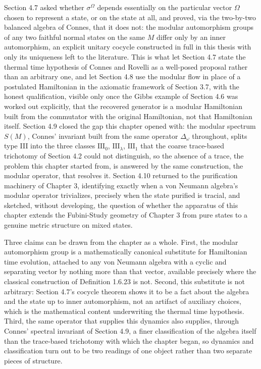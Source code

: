 Section 4.7 asked whether $\sigma^\Omega$ depends essentially on the particular vector $\Omega$ chosen to represent a state, or on the state at all, and proved, via the two-by-two balanced algebra of Connes, that it does not: the modular automorphism groups of any two faithful normal states on the same $M$ differ only by an inner automorphism, an explicit unitary cocycle constructed in full in this thesis with only its uniqueness left to the literature. This is what let Section 4.7 state the thermal time hypothesis of Connes and Rovelli as a well-posed proposal rather than an arbitrary one, and let Section 4.8 use the modular flow in place of a postulated Hamiltonian in the axiomatic framework of Section 3.7, with the honest qualification, visible only once the Gibbs example of Section 4.6 was worked out explicitly, that the recovered generator is a modular Hamiltonian built from the commutator with the original Hamiltonian, not that Hamiltonian itself. Section 4.9 closed the gap this chapter opened with: the modular spectrum $S(M)$, Connes' invariant built from the same operator $\Delta_\omega$ throughout, splits type III into the three classes $\mathrm{III}_0$, $\mathrm{III}_\lambda$, $\mathrm{III}_1$ that the coarse trace-based trichotomy of Section 4.2 could not distinguish, so the absence of a trace, the problem this chapter started from, is answered by the same construction, the modular operator, that resolves it. Section 4.10 returned to the purification machinery of Chapter 3, identifying exactly when a von Neumann algebra's modular operator trivializes, precisely when the state purified is tracial, and sketched, without developing, the question of whether the apparatus of this chapter extends the Fubini-Study geometry of Chapter 3 from pure states to a genuine metric structure on mixed states.

Three claims can be drawn from the chapter as a whole. First, the modular automorphism group is a mathematically canonical substitute for Hamiltonian time evolution, attached to any von Neumann algebra with a cyclic and separating vector by nothing more than that vector, available precisely where the classical construction of Definition 1.6.23 is not. Second, this substitute is not arbitrary: Section 4.7's cocycle theorem shows it to be a fact about the algebra and the state up to inner automorphism, not an artifact of auxiliary choices, which is the mathematical content underwriting the thermal time hypothesis. Third, the same operator that supplies this dynamics also supplies, through Connes' spectral invariant of Section 4.9, a finer classification of the algebra itself than the trace-based trichotomy with which the chapter began, so dynamics and classification turn out to be two readings of one object rather than two separate pieces of structure.

